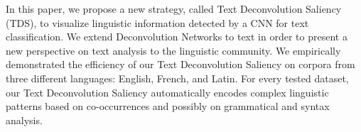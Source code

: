 In this paper, we propose a new strategy, called Text Deconvolution Saliency (TDS), to visualize linguistic information detected by a CNN for text classification. We extend Deconvolution Networks to text in order to present a new perspective on text analysis to the linguistic community. We empirically demonstrated the efficiency of our Text Deconvolution Saliency on corpora from three different languages: English, French, and Latin. For every tested dataset, our Text Deconvolution Saliency automatically encodes complex linguistic patterns based on co-occurrences and possibly on grammatical and syntax analysis.
